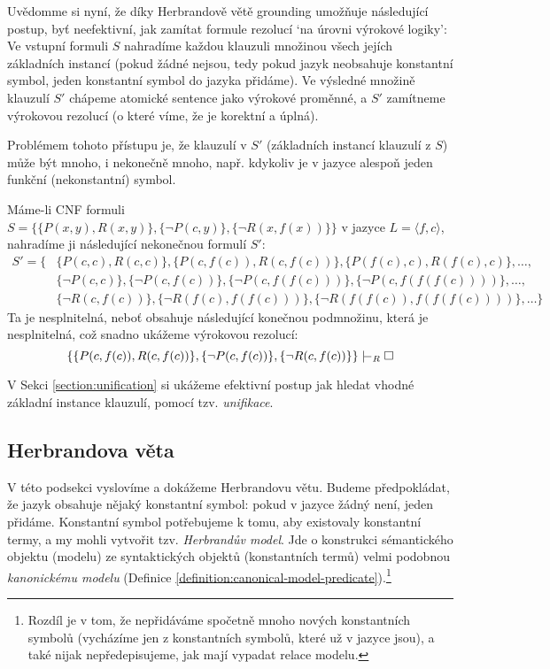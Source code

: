 Uvědomme si nyní, že díky Herbrandově větě grounding umožňuje následující postup, byť neefektivní, jak zamítat formule rezolucí `na úrovni výrokové logiky': Ve vstupní formuli $S$ nahradíme každou klauzuli množinou všech jejích základních instancí (pokud žádné nejsou, tedy pokud jazyk neobsahuje konstantní symbol, jeden konstantní symbol do jazyka přidáme). Ve výsledné množině klauzulí $S'$ chápeme atomické sentence jako výrokové proměnné, a $S'$ zamítneme výrokovou rezolucí (o které víme, že je korektní a úplná).

Problémem tohoto přístupu je, že klauzulí v $S'$ (základních instancí klauzulí z $S$) může být mnoho, i nekonečně mnoho, např. kdykoliv je v jazyce alespoň jeden funkční (nekonstantní) symbol.

\begin{example}
Máme-li CNF formuli $S=\{\{P(x,y),R(x,y)\},\{\neg P(c,y)\},\{\neg R(x,f(x))\}\}$ v jazyce $L=\langle f,c\rangle$, nahradíme ji následující nekonečnou formulí $S'$:
\begin{align*}
    S'=\{&\{P(c,c),R(c,c)\},\{P(c,f(c)),R(c,f(c))\},\{P(f(c),c),R(f(c),c)\},\dots,\\
    &\{\neg P(c,c)\}, \{\neg P(c,f(c))\},\{\neg P(c,f(f(c)))\},\{\neg P(c,f(f(f(c))))\}, \dots,\\
    &\{\neg R(c,f(c))\}, \{\neg R(f(c),f(f(c)))\},\{\neg R(f(f(c)),f(f(f(c))))\},\dots\}
\end{align*}
Ta je nesplnitelná, neboť obsahuje následující konečnou podmnožinu, která je nesplnitelná, což snadno ukážeme výrokovou rezolucí:
$$
\{\{P(c,f(c)),R(c,f(c))\},\{\neg P(c,f(c))\},\{\neg R(c,f(c))\}\}\proves_R\square
$$
\end{example}
V Sekci \ref{section:unification} si ukážeme efektivní postup jak hledat vhodné základní instance klauzulí, pomocí tzv. \emph{unifikace}.


\subsection{Herbrandova věta}

V této podsekci vyslovíme a dokážeme Herbrandovu větu. Budeme předpokládat, že jazyk obsahuje nějaký konstantní symbol: pokud v jazyce žádný není, jeden přidáme. Konstantní symbol potřebujeme k tomu, aby existovaly konstantní termy, a my mohli vytvořit tzv. \emph{Herbrandův model}. Jde o konstrukci sémantického objektu (modelu) ze syntaktických objektů (konstantních termů) velmi podobnou \emph{kanonickému modelu} (Definice \ref{definition:canonical-model-predicate}).\footnote{Rozdíl je v tom, že nepřidáváme spočetně mnoho nových konstantních symbolů (vycházíme jen z konstantních symbolů, které už v jazyce jsou), a také nijak nepředepisujeme, jak mají vypadat relace modelu.}

